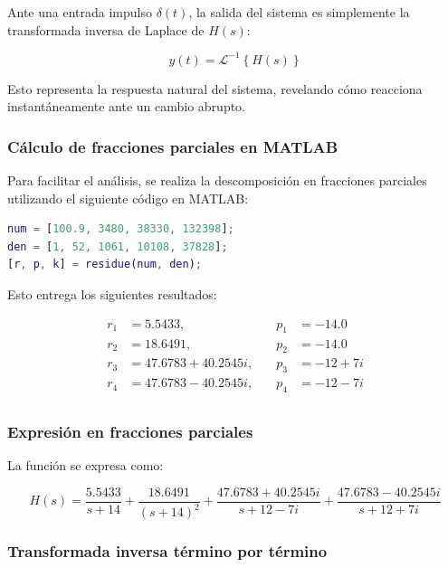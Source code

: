 \documentclass[11pt,letterpaper]{article}
\begin{document}
Ante una entrada impulso \( \delta(t) \), la salida del sistema es simplemente la transformada inversa de Laplace de \( H(s) \):

\begin{equation}
y(t) = \mathcal{L}^{-1}\left\{ H(s) \right\}
\end{equation}

Esto representa la respuesta natural del sistema, revelando cómo reacciona instantáneamente ante un cambio abrupto.

\subsubsection{Cálculo de fracciones parciales en MATLAB}

Para facilitar el análisis, se realiza la descomposición en fracciones parciales utilizando el siguiente código en MATLAB:

\begin{lstlisting}[language=Matlab, caption={Fracciones parciales de H(s)}]
num = [100.9, 3480, 38330, 132398];
den = [1, 52, 1061, 10108, 37828];
[r, p, k] = residue(num, den);
\end{lstlisting}

Esto entrega los siguientes resultados:

\[
\begin{aligned}
r_1 &= 5.5433, \quad & p_1 &= -14.0 \\
r_2 &= 18.6491, \quad & p_2 &= -14.0 \\
r_3 &= 47.6783 + 40.2545i, \quad & p_3 &= -12 + 7i \\
r_4 &= 47.6783 - 40.2545i, \quad & p_4 &= -12 - 7i \\
\end{aligned}
\]

\subsubsection{Expresión en fracciones parciales}

La función se expresa como:

\begin{equation}
H(s) = \frac{5.5433}{s + 14} + \frac{18.6491}{(s + 14)^2} +
\frac{47.6783 + 40.2545i}{s + 12 - 7i} + \frac{47.6783 - 40.2545i}{s + 12 + 7i}
\end{equation}

\subsubsection{Transformada inversa término por término}
\end{document}
